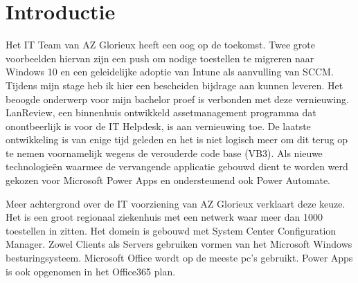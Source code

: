 
\section{Introductie} %
\label{sec:introductie}

Het IT Team van AZ Glorieux heeft een oog op de toekomst. Twee grote voorbeelden hiervan zijn een push om nodige toestellen te migreren naar Windows 10 en een geleidelijke adoptie van Intune als aanvulling van SCCM. Tijdens mijn stage heb ik hier een bescheiden bijdrage aan kunnen leveren. Het beoogde onderwerp voor mijn bachelor proef is verbonden met deze vernieuwing. LanReview, een binnenhuis ontwikkeld assetmanagement programma dat onontbeerlijk is voor de IT Helpdesk, is aan vernieuwing toe. De laatste ontwikkeling is van enige tijd geleden en het is niet logisch meer om dit terug op te nemen voornamelijk wegens de verouderde code base (VB3). Als nieuwe technologieën waarmee de vervangende applicatie gebouwd dient te worden werd gekozen voor Microsoft Power Apps en ondersteunend ook Power Automate.

Meer achtergrond over de IT voorziening van AZ Glorieux verklaart deze keuze. Het is een groot regionaal ziekenhuis met een netwerk waar meer dan 1000 toestellen in zitten. Het domein is gebouwd met System Center Configuration Manager. Zowel Clients als Servers gebruiken vormen van het Microsoft Windows besturingsysteem. Microsoft Office wordt op de meeste pc's gebruikt. Power Apps is ook opgenomen in het Office365 plan.

\vspace{5mm}

